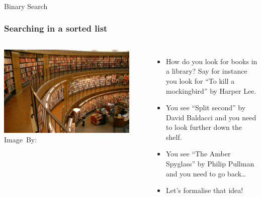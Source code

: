 \begin{frame}[fragile]\frametitle{}
\begin{center}
{\Large Binary Search}
\end{center}

\end{frame}

\begin{frame}
	\frametitle{Searching in a sorted list}
	
	\begin{columns}
	\begin{center}
		\includegraphics[width=0.9\textwidth]{images/library.jpg}\\
		\hspace*{15pt}\hbox{\scriptsize Image By:}
	\end{center}
			\begin{itemize}
			\item How do you look for books in a library? Say for instance you look for ``To kill a mockingbird'' by Harper Lee.
				\item You see ``Split second'' by David Baldacci and you need to look further down the shelf.
					
				\item You see ``The Amber Spyglass'' by Philip Pullman and you need to go back\dots
					
				\item Let's formalise that idea!
			\end{itemize}
	\end{columns}
\end{frame}

